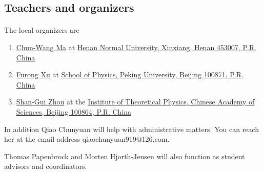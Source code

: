 \documentclass[%
oneside,                 %
final,                   %
10pt]{article}
\begin{document}
\noindent



\subsection{Teachers and organizers}

\paragraph{}
The local organizers are 

\begin{enumerate}
\item \href{{https://www.researchgate.net/profile/Chun-Wang_Ma}}{Chun-Wang Ma} at \href{{http://www.htu.cn/english/}}{Henan Normal University, Xinxiang, Henan 453007, P.R. China}

\item \href{{http://www.phy.pku.edu.cn/~frxu/}}{Furong Xu} at \href{{http://english.pku.edu.cn/}}{School of Physics, Peking University, Beijing 100871, P.R. China}

\item \href{{http://www.itp.ac.cn/~sgzhou/eindex.html}}{Shan-Gui Zhou} at  the \href{{http://www.cas.ac.cn/}}{Institute of Theoretical Physics, Chinese Academy of Sciences, Beijing 100864, P.R. China} 
\end{enumerate}

\noindent
In addition Qiao Chunyuan will help with administrative matters. You can reach her at the email address qiaochunyuan919@126.com.

Thomas Papenbrock and Morten Hjorth-Jensen  will also function as student advisors and coordinators.
\end{document}
